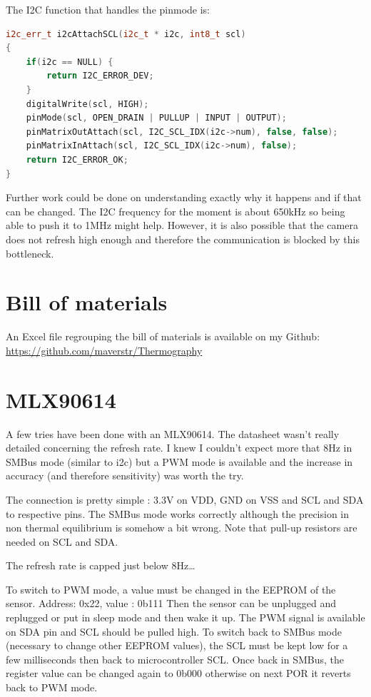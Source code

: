 \documentclass[a4paper]{article}
\begin{document}
The I2C function that handles the pinmode is:
\begin{lstlisting}[language=C++]
i2c_err_t i2cAttachSCL(i2c_t * i2c, int8_t scl)
{
    if(i2c == NULL) {
        return I2C_ERROR_DEV;
    }
    digitalWrite(scl, HIGH);
    pinMode(scl, OPEN_DRAIN | PULLUP | INPUT | OUTPUT);
    pinMatrixOutAttach(scl, I2C_SCL_IDX(i2c->num), false, false);
    pinMatrixInAttach(scl, I2C_SCL_IDX(i2c->num), false);
    return I2C_ERROR_OK;
}
\end{lstlisting}

Further work could be done on understanding exactly why it happens and if that can be changed. The I2C frequency for the moment is about 650kHz so being able to push it to 1MHz might help.
However, it is also possible that the camera does not refresh high enough and therefore the communication is blocked by this bottleneck.





\appendix

\section{Bill of materials}
An Excel file regrouping the bill of materials is available on my Github: \url{https://github.com/maverstr/Thermography}

\section{MLX90614}
A few tries have been done with an MLX90614.
The datasheet wasn’t really detailed concerning the refresh rate. I knew I couldn't expect more that 8Hz in SMBus mode (similar to i2c) but a PWM mode is available and the increase in accuracy (and therefore sensitivity) was worth the try.

The connection is pretty simple : 3.3V on VDD, GND on VSS and SCL and SDA to respective pins. The SMBus mode works correctly although the precision in non thermal equilibrium is somehow a bit wrong.
Note that pull-up resistors are needed on SCL and SDA.

The refresh rate is capped just below 8Hz…

To switch to PWM mode, a value must be changed in the EEPROM of the sensor. Address: 0x22, value : 0b111
Then the sensor can be unplugged and replugged or put in sleep mode and then wake it up. The PWM signal is available on SDA pin and SCL should be pulled high.
To switch back to SMBus mode (necessary to change other EEPROM values), the SCL must be kept low for a few milliseconds then back to microcontroller SCL. Once back in SMBus, the register value can be changed again to 0b000 otherwise on next POR it reverts back to PWM mode.
\end{document}
